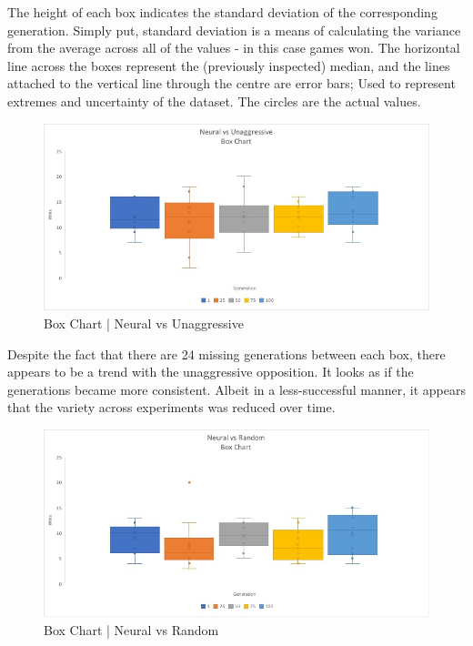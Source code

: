 \documentclass[12pt,a4paper]{article}
\begin{document}
The height of each box indicates the standard deviation of the corresponding generation. Simply put, standard deviation is a means of calculating the variance from the average across all of the values - in this case games won. The horizontal line across the boxes represent the (previously inspected) median, and the lines attached to the vertical line through the centre are error bars; Used to represent extremes and uncertainty of the dataset. The circles are the actual values.

\newpage
\begin{figure}[h]
	\centering
	\includegraphics[width = \textwidth]{BoxUna.jpg}
	\caption{Box Chart | Neural vs Unaggressive}
\end{figure}

Despite the fact that there are 24 missing generations between each box, there appears to be a trend with the unaggressive opposition. It looks as if the generations became more consistent. Albeit in a less-successful manner, it appears that the variety across experiments was reduced over time. 

\begin{figure}[h]
	\centering
	\includegraphics[width = \textwidth]{BoxRand.jpg}
	\caption{Box Chart | Neural vs Random}
\end{figure}
\end{document}
